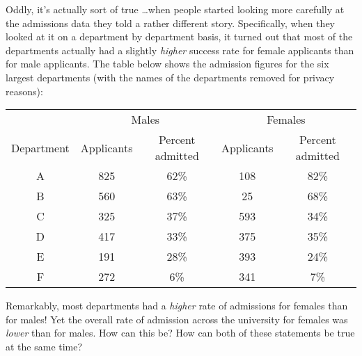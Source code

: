 Oddly, it's actually sort of true \ldots when people started looking more carefully at the admissions data \cite{Bickel1975} they told a rather different story. Specifically, when they looked at it on a department by department basis, it turned out that most of the departments actually had a slightly {\it higher} success rate for female applicants than for male applicants. The table below shows the admission figures for the six largest departments (with the names of the departments removed for privacy reasons):
\begin{center}
\begin{tabular}{c|cc|cc}
	& \multicolumn{2}{c|}{Males} & \multicolumn{2}{c}{Females} \\ 
	Department & Applicants	& Percent admitted &	Applicants & Percent admitted \\ \hline
A &	825	&62\%&	108&	82\% \\
B&	560	&63\%&	25	&68\% \\
C&	325	&37\%&	593	&34\%\\
D&	417	&33\%&	375	&35\%\\
E&	191	&28\%&	393	&24\%\\
F&	272	&6\%	&	341	&7\%\\
\end{tabular}
\end{center}
\noindent
Remarkably, most departments had a {\it higher} rate of admissions for females than for males! Yet the overall rate of admission across the university for females was {\it lower} than for males.  How can this be? How can both of these statements be true at the same time?

